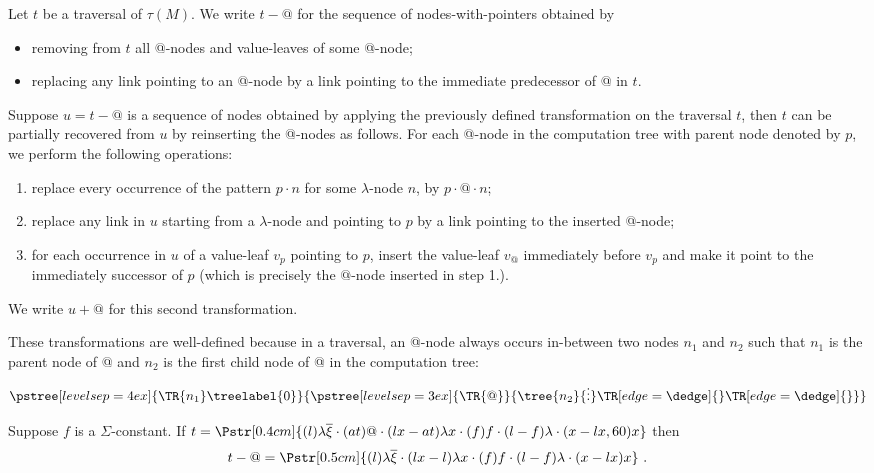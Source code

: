 \begin{definition}
\label{dfn:appnode_filter} Let $t$ be a traversal of $\tau(M)$. We
write $t-@$ for the sequence of nodes-with-pointers obtained by
\begin{itemize}
\item removing from $t$ all @-nodes and value-leaves of some @-node;
\item replacing any link pointing to an @-node by a link pointing to the immediate predecessor of @ in $t$.
\end{itemize}


Suppose $u = t-@$ is a sequence of nodes obtained by applying the
previously defined transformation on the traversal $t$, then $t$ can
be partially recovered from $u$ by reinserting the @-nodes as
follows. For each @-node in the computation tree with parent node
denoted by $p$, we perform the following operations:
\begin{enumerate}
\item replace every occurrence of the pattern $p \cdot n$ for some $\lambda$-node $n$, by $p \cdot @ \cdot n$;
\item replace any link in $u$ starting from a $\lambda$-node and pointing to $p$ by a link pointing to the inserted @-node;
\item for each occurrence in $u$ of a value-leaf $v_p$ pointing to $p$, insert the value-leaf $v_@$
    immediately before $v_p$ and make it point to the
    immediately successor of $p$ (which is precisely the $@$-node
inserted in step 1.).
\end{enumerate}
We write $u+@$ for this second transformation.
\end{definition}
These transformations are well-defined because in a traversal, an
@-node always occurs in-between two nodes $n_1$ and $n_2$ such that
$n_1$ is the parent node of @ and $n_2$ is the first child node of @
in the computation tree:
$$      \pstree[levelsep=4ex]{\TR{n_1}\treelabel{0} }
        {
            \pstree[levelsep=3ex]{\TR{@}}
            {
                \tree{n_2}{\vdots}
                \TR[edge=\dedge]{}
                \TR[edge=\dedge]{}
            }
        }
$$
\begin{example} Suppose $f$ is a $\Sigma$-constant.
If $t = \Pstr[0.4cm]{ (l){\lambda \overline{\xi}} \cdot (at)@ \cdot (lx-at){\lambda x}\cdot (f)f \cdot (l-f){\lambda} \cdot (x-lx,60)x}$ then
$$t-@ = \Pstr[0.5cm]{ (l){\lambda \overline{\xi}}
 \cdot (lx-l){\lambda x}\cdot (f)f\cdot (l-f){\lambda} \cdot (x-lx)x} \ .$$
\end{example}


